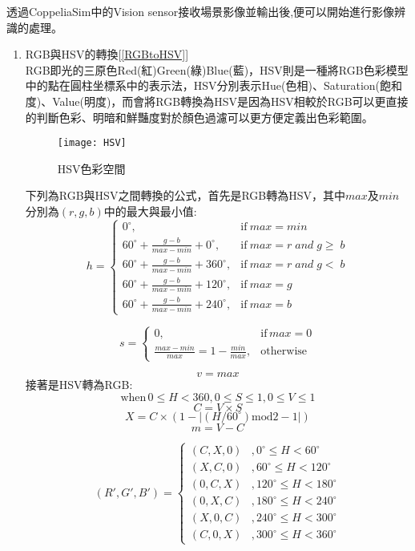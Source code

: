  透過CoppeliaSim中的Vision sensor接收場景影像並輸出後,便可以開始進行影像辨識的處理。\\
\begin{enumerate}
\item RGB與HSV的轉換[\ref{RGBtoHSV}]\\
RGB即光的三原色Red(紅)Green(綠)Blue(藍)，HSV則是一種將RGB色彩模型中的點在圓柱坐標系中的表示法，HSV分別表示Hue(色相)、Saturation(飽和度)、Value(明度)，而會將RGB轉換為HSV是因為HSV相較於RGB可以更直接的判斷色彩、明暗和鮮豔度對於顏色過濾可以更方便定義出色彩範圍。\\
\begin{figure}[hbt!]
\center
\texttt{[image: HSV]}
\caption{\Large HSV色彩空間}
\end{figure}
\newpage
下列為RGB與HSV之間轉換的公式，首先是RGB轉為HSV，其中$max$及$min$分別為$(r,g,b)$中的最大與最小值:
$$h=\left\{\begin{matrix}
0^{\circ}, & \textrm{if}\ max=min\\ 
60^{\circ}+\frac{g-b}{max-min}+0^{\circ},& \textrm{if}\ max=r\;and\;g\geq \;b\\ 
60^{\circ}+\frac{g-b}{max-min}+360^{\circ}, & \textrm{if}\ max=r\;and\;g<  \;b\\ 
60^{\circ}+\frac{g-b}{max-min}+120^{\circ}, & \textrm{if}\ max=g\\ 
60^{\circ}+\frac{g-b}{max-min}+240^{\circ}, & \textrm{if}\ max=b
\end{matrix}\right.$$

$$s=\left\{\begin{matrix}
0, & \textrm{if}\,max=0\\ 
\frac{max-min}{max}=1-\frac{min}{max}, & \textrm{otherwise}
\end{matrix}\right.$$

$$v=max$$
接著是HSV轉為RGB:
$$\textrm{when}\,0\leq H< 360,0\leq S\leq 1,0\leq V\leq 1$$
$$C=V\times S$$
$$X=C\times (1-\left | (H/60^{\circ})\textrm{mod}2-1 \right |)$$
$$m=V-C$$

$$({R}',{G}',{B}')=\left\{\begin{matrix}
(C,X,0)& ,0^{\circ}\leq H< 60^{\circ}\\ 
 (X,C,0)& ,60^{\circ}\leq H< 120^{\circ}\\ 
 (0,C,X)& ,120^{\circ}\leq H< 180^{\circ}\\ 
 (0,X,C)& ,180^{\circ}\leq H< 240^{\circ}\\ 
 (X,0,C)& ,240^{\circ}\leq H< 300^{\circ}\\ 
 (C,0,X)& ,300^{\circ}\leq H< 360^{\circ}
\end{matrix}\right.$$



\end{enumerate}
